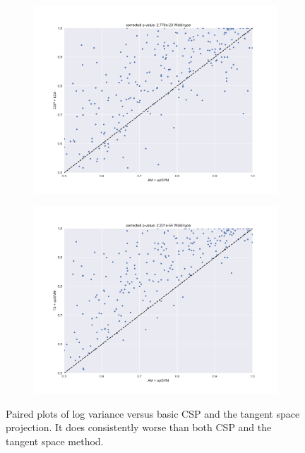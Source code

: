 \begin{figure}
    \centering
    \begin{subfigure}{0.5\textwidth}
        \includegraphics[width=\textwidth]{Figures/AM1.pdf}
    \end{subfigure}%
    \begin{subfigure}{0.5\textwidth}
        \includegraphics[width=\textwidth]{Figures/AM2.pdf}
    \end{subfigure}
    \caption{Paired plots of log variance versus basic CSP and the
      tangent space projection. It does
      consistently worse than both CSP and the tangent space method.}
    \label{fig:am}
\end{figure}
